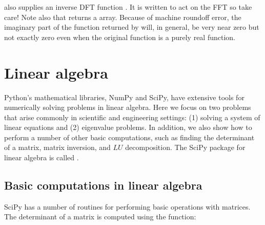 \documentclass[letterpaper,10pt,english]{sphinxmanual}
\begin{document}
\sphinxAtStartPar
{} also supplies an inverse DFT function .  It is written to act on the  FFT so take care!  Note also that  returns a  array.  Because of machine roundoff error, the imaginary part of the function returned by  will, in general, be very near zero but not exactly zero even when the original function is a purely real function.

\ignorespaces 

\section{Linear algebra}
\label{\detokenize{chap9/chap9_scipy:linear-algebra}}\label{\detokenize{chap9/chap9_scipy:index-6}}
\sphinxAtStartPar
Python’s mathematical libraries, NumPy and SciPy, have extensive tools for numerically solving problems in linear algebra.  Here we focus on two problems that arise commonly in scientific and engineering settings: (1) solving a system of linear equations and (2) eigenvalue problems.  In addition, we also show how to perform a number of other basic computations, such as finding the determinant of a matrix, matrix inversion, and \(LU\) decomposition.  The SciPy package for linear algebra is called .


\subsection{Basic computations in linear algebra}
\label{\detokenize{chap9/chap9_scipy:basic-computations-in-linear-algebra}}
\sphinxAtStartPar
SciPy has a number of routines for performing basic operations with matrices.  The determinant of a matrix is computed using the  function:

\begin{sphinxVerbatim}[commandchars=\\\{\},numbers=left,firstnumber=1,stepnumber=1]
 
  \PYG{p}{[}\PYG{p}{[} \PYG{p}{]} \PYG{p}{[} \PYG{p}{]}\PYG{p}{]}
\PYG{p}{[}\PYG{p}{[}  \PYG{p}{]}
\PYG{g+go}{               [ 4,  5]])}

\end{sphinxVerbatim}
\end{document}
